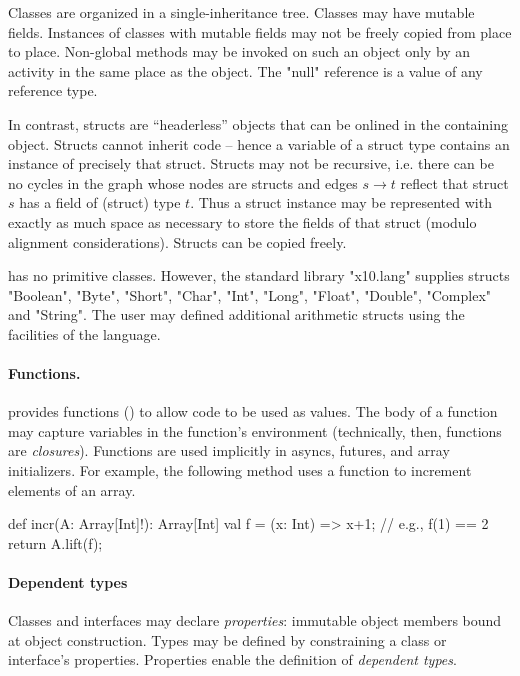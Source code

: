 Classes are organized in a single-inheritance tree. Classes may have
mutable fields.  Instances of classes with mutable fields may not be
freely copied from place to place. Non-global methods may be invoked
on such an object only by an activity in the same place as the object.
The \xcd"null" reference is a value of any reference type.

In contrast, structs are ``headerless'' objects that can be onlined in
the containing object.  Structs cannot inherit code -- hence a
variable of a struct type contains an instance of precisely that
struct. Structs may not be recursive, i.e.{} there can be no cycles in
the graph whose nodes are structs and edges $s \rightarrow t$ reflect
that struct $s$ has a field of (struct) type $t$. Thus a struct
instance may be represented with exactly as much space as necessary to
store the fields of that struct (modulo alignment considerations). Structs
can be copied freely.

\Xten{} has no primitive classes. However, the standard library
\xcd"x10.lang" supplies structs \xcd"Boolean", \xcd"Byte",
\xcd"Short", \xcd"Char", \xcd"Int", \xcd"Long", \xcd"Float",
\xcd"Double", \xcd"Complex" and \xcd"String". The user may defined
additional arithmetic structs using the facilities of the
language.

\paragraph{Functions.}
\Xten{} provides functions () to allow code to be used
as values.  The body of a function may capture variables in the
function's environment (technically, then, functions are {\em
  closures}).  Functions are used implicitly in asyncs, futures, and
array initializers.
%
For example, the following method uses a function to increment
elements of an array.
\begin{xten}
def incr(A: Array[Int]!): Array[Int] {
    val f = (x: Int) => x+1; // e.g., f(1) == 2
    return A.lift(f);
}
\end{xten}


\paragraph{Dependent types}
Classes and interfaces may declare \emph{properties}: immutable object members bound at object construction.
Types may be defined by constraining a
class or interface's properties.
Properties enable the definition of \emph{dependent types}.


